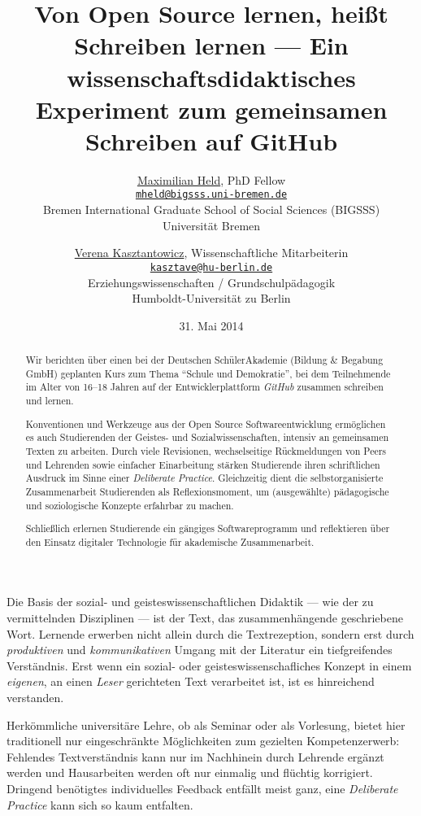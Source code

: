 \documentclass
	[
		11pt,
		a4paper,
		oneside,
		ngerman
	]
	{article}
\title{
	Von Open Source lernen, heißt Schreiben lernen ---
	Ein wissenschaftsdidaktisches Experiment zum gemeinsamen Schreiben auf GitHub
}
\date{31. Mai 2014}
\author{
	\href{http://www.maxheld.de}{Maximilian Held}, PhD Fellow\\
	\href{mailto:mheld@bigsss.uni-bremen.de}{\texttt{mheld@bigsss.uni-bremen.de}}\\
	Bremen International Graduate School of Social Sciences (BIGSSS)\\
	Universität Bremen
	\and
	\href{https://www.erziehungswissenschaften.hu-berlin.de/grundschulpaed/mitarbeiterinnen/lb-deutsch/v.-kasztantowicz}{Verena Kasztantowicz}, Wissenschaftliche Mitarbeiterin\\
	\href{mailto:kasztave@hu-berlin.de}{\texttt{kasztave@hu-berlin.de}}\\
	Erziehungswissenschaften / Grundschulpädagogik \\
	Humboldt-Universität zu Berlin
}
\begin{document}
\maketitle

\begin{abstract}
	Wir berichten über einen bei der Deutschen SchülerAkademie (Bildung \& Begabung GmbH) geplanten Kurs zum Thema ``Schule und Demokratie'', bei dem Teilnehmende im Alter von 16--18 Jahren auf der Entwicklerplattform \emph{GitHub} zusammen schreiben und lernen.

	Konventionen und Werkzeuge aus der Open Source Softwareentwicklung ermöglichen es auch Studierenden der Geistes- und Sozialwissenschaften, intensiv an gemeinsamen Texten zu arbeiten.
	Durch viele Revisionen, wechselseitige Rückmeldungen von Peers und Lehrenden sowie einfacher Einarbeitung stärken Studierende ihren schriftlichen Ausdruck im Sinne einer \emph{Deliberate Practice}.
	Gleichzeitig dient die selbstorganisierte Zusammenarbeit Studierenden als Reflexionsmoment, um (ausgewählte) pädagogische und soziologische Konzepte erfahrbar zu machen.

	Schließlich erlernen Studierende ein gängiges Softwareprogramm und reflektieren über den Einsatz digitaler Technologie für akademische Zusammenarbeit.
\end{abstract}

Die Basis der sozial- und geisteswissenschaftlichen Didaktik --- wie der zu vermittelnden Disziplinen --- ist der Text, das zusammenhängende geschriebene Wort.
Lernende erwerben nicht allein durch die Textrezeption, sondern erst durch \emph{produktiven} und \emph{kommunikativen} Umgang mit der Literatur ein tiefgreifendes Verständnis.
Erst wenn ein sozial- oder geisteswissenschafliches Konzept in einem \emph{eigenen}, an einen \emph{Leser} gerichteten Text verarbeitet ist, ist es hinreichend verstanden.

Herkömmliche universitäre Lehre, ob als Seminar oder als Vorlesung, bietet hier traditionell nur eingeschränkte Möglichkeiten zum gezielten Kompetenzerwerb: Fehlendes Textverständnis kann nur im Nachhinein durch Lehrende ergänzt werden und Hausarbeiten werden oft nur einmalig und flüchtig korrigiert.
Dringend benötigtes individuelles Feedback entfällt meist ganz, eine \emph{Deliberate Practice} \parencite{Ericsson2007} kann sich so kaum entfalten.
\end{document}
